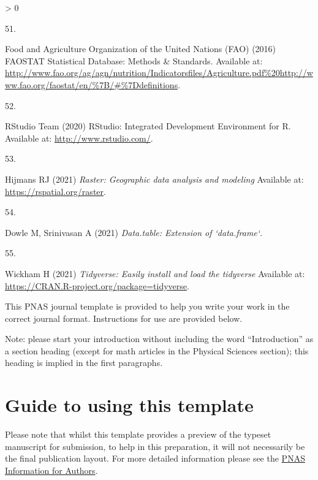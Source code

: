 \documentclass[9pt,twocolumn,twoside,]{pnas-new}
\newlength{\csllabelwidth}
\newlength{\cslhangindent}
\newenvironment{CSLReferences}[2] %
 {%
  \setlength{\parindent}{0pt}
  \ifodd #1 \everypar{\setlength{\hangindent}{\cslhangindent}}\ignorespaces\fi
  \ifnum #2 > 0
  \setlength{\parskip}{#2\baselineskip}
  \fi
 }%
 {}
\newcommand{\CSLLeftMargin}[1]{\parbox[t]{\csllabelwidth}{#1}}
\newcommand{\CSLRightInline}[1]{\parbox[t]{\linewidth - \csllabelwidth}{#1}\break}
\begin{document}
\begin{CSLReferences}{0}{0}
\leavevmode\hypertarget{ref-FAO2016}{}%
\CSLLeftMargin{51. }
\CSLRightInline{Food and Agriculture Organization of the United Nations
(FAO) (2016) {FAOSTAT Statistical Database: Methods {\&} Standards}.
Available at:
\url{http://www.fao.org/ag/agn/nutrition/Indicatorsfiles/Agriculture.pdf\%20http://www.fao.org/faostat/en/\%7B/\#\%7Ddefinitions}.}

\leavevmode\hypertarget{ref-RStudio}{}%
\CSLLeftMargin{52. }
\CSLRightInline{RStudio Team (2020) {RStudio: Integrated Development
Environment for R}. Available at: \url{http://www.rstudio.com/}.}

\leavevmode\hypertarget{ref-R-raster}{}%
\CSLLeftMargin{53. }
\CSLRightInline{Hijmans RJ (2021) \emph{Raster: Geographic data analysis
and modeling} Available at: \url{https://rspatial.org/raster}.}

\leavevmode\hypertarget{ref-R-data.table}{}%
\CSLLeftMargin{54. }
\CSLRightInline{Dowle M, Srinivasan A (2021) \emph{Data.table: Extension
of `data.frame`}.}

\leavevmode\hypertarget{ref-R-tidyverse}{}%
\CSLLeftMargin{55. }
\CSLRightInline{Wickham H (2021) \emph{Tidyverse: Easily install and
load the tidyverse} Available at:
\url{https://CRAN.R-project.org/package=tidyverse}.}

\end{CSLReferences}

This PNAS journal template is provided to help you write your work in
the correct journal format. Instructions for use are provided below.

Note: please start your introduction without including the word
``Introduction'' as a section heading (except for math articles in the
Physical Sciences section); this heading is implied in the first
paragraphs.

\hypertarget{guide-to-using-this-template}{%
\section*{Guide to using this
template}\label{guide-to-using-this-template}}

Please note that whilst this template provides a preview of the typeset
manuscript for submission, to help in this preparation, it will not
necessarily be the final publication layout. For more detailed
information please see the
\href{http://www.pnas.org/site/authors/format.xhtml}{PNAS Information
for Authors}.
\end{document}
